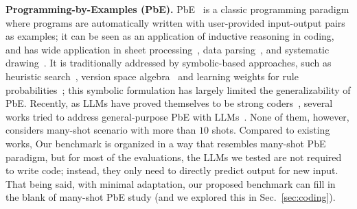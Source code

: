 \textbf{Programming-by-Examples (PbE).} PbE~\citep{myers1986visual, cypher1993watch} is a classic programming paradigm where programs are automatically written with user-provided input-output pairs as examples; it can be seen as an application of inductive reasoning in coding, and has wide application in sheet processing~\citep{gulwani2011automating}, data parsing~\citep{leung2015interactive}, and systematic drawing~\citep{cheema2014practical}. It is traditionally addressed by symbolic-based approaches, such as heuristic search~\citep{gulwani2011automating, cheema2014practical}, version space algebra~\citep{lau2003programming} and learning weights for rule probabilities~\citep{menon2013machine}; this symbolic formulation has largely limited the generalizability of PbE. Recently, as LLMs have proved themselves to be strong coders~\citep{guo2024deepseek}, several works tried to address general-purpose PbE with LLMs~\citep{shi2023lambdabeam, shi2023exedec,shao2024case2code, li2024programming}. None of them, however, considers many-shot scenario with more than $10$ shots. Compared to existing works, Our benchmark is organized in a way that resembles many-shot PbE paradigm, but for most of the evaluations, the LLMs we tested are not required to write code; instead, they only need to directly predict output for new input. That being said, with minimal adaptation, our proposed benchmark can fill in the blank of many-shot PbE study (and we explored this in Sec.~\ref{sec:coding}).